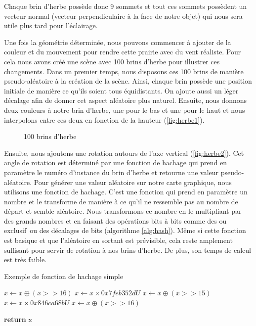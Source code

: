 Chaque brin d'herbe possède donc 9 sommets et tout ces sommets possèdent un vecteur normal (vecteur perpendiculaire à la face de notre objet) qui nous sera utile plus tard pour l'éclairage.

\noindent Une fois la géométrie déterminée, nous pouvons commencer à ajouter de la couleur et du mouvement pour rendre cette prairie avec du vent réaliste. Pour cela nous avons créé une scène avec 100 brins d'herbe pour illustrer ces changements. 
Dans un premier temps, nous disposons ces 100 brins de manière pseudo-aléatoire à la création de la scène. Ainsi, chaque brin possède une position initiale de manière ce qu'ils soient tous équidistants. On ajoute aussi un léger décalage afin de donner cet aspect aléatoire plus naturel. Ensuite, nous donnons deux couleurs à notre brin d'herbe, une pour le bas et une pour le haut et nous interpolons entre ces deux en fonction de la hauteur (\autoref{fig:herbe1}).

\begin{figure}[H]			
	\caption{100 brins d'herbe}
	\label{fig:herbe1}
\end{figure}

Ensuite, nous ajoutons une rotation autours de l'axe vertical (\autoref{fig:herbe2}). Cet angle de rotation est déterminé par une fonction de hachage qui prend en paramètre le numéro d'instance du brin d'herbe et retourne une valeur pseudo-aléatoire.
Pour générer une valeur aléatoire sur notre carte graphique, nous utilisons une fonction de hachage. C'est une fonction qui prend en paramètre un nombre et le transforme de manière à ce qu'il ne ressemble pas au nombre de départ et semble aléatoire. Nous transformons ce nombre en le multipliant par des grands nombres et en faisant des opérations bits à bits comme des \og ou exclusif\fg \ ou des décalages de bits (algorithme \autoref{alg:hash}). Même si cette fonction est basique et que l'aléatoire en sortant est prévisible, cela reste amplement suffisant pour servir de rotation à nos brins d'herbe. De plus, son temps de calcul est très faible. 

\begin{algorithm}[H]
	\caption{Exemple de fonction de hachage simple}
	\label{alg:hash}
	\begin{algorithmic}
		\State $x \gets x\oplus (x >>16)$
		\State $x \gets x\times 0x7feb352dU$
		\State $x \gets x\oplus (x >>15)$
		\State $x \gets x\times 0x846ca68bU$
		\State $x \gets x\oplus (x >>16)$
		
		\State \textbf{return} x
	\end{algorithmic}
\end{algorithm}



